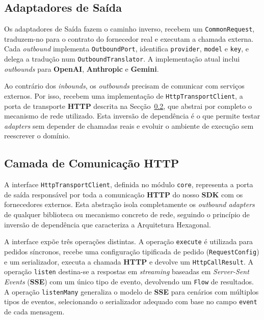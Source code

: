     \subsection{Adaptadores de Saída}
    Os adaptadores de Saída fazem o caminho inverso, recebem um \texttt{CommonRequest}, traduzem-no para o contrato do fornecedor real e executam a chamada externa. Cada \textit{outbound} implementa \texttt{OutboundPort}, identifica \texttt{provider}, \texttt{model} e \texttt{key}, e delega a tradução num \texttt{OutboundTranslator}. A implementação atual inclui \textit{outbounds} para \textbf{OpenAI}, \textbf{Anthropic} e \textbf{Gemini}.

    Ao contrário dos \textit{inbounds}, os \textit{outbounds} precisam de comunicar com serviços externos. Por isso, recebem uma implementação de \texttt{HttpTransportClient}, a porta de transporte \textbf{HTTP} descrita na Secção~\ref{subsec:http-transport-client}, que abstrai por completo o mecanismo de rede utilizado. Esta inversão de dependência é o que permite testar \textit{adapters} sem depender de chamadas reais e evoluir o ambiente de execução sem reescrever o domínio.

    \subsection{Camada de Comunicação HTTP}
    \label{subsec:http-transport-client}

    A interface \texttt{HttpTransportClient}, definida no módulo \texttt{core}, representa a porta de saída responsável por toda a comunicação \textbf{HTTP} do nosso \textbf{SDK} com os fornecedores externos. Esta abstração isola completamente os \textit{outbound adapters} de qualquer biblioteca ou mecanismo concreto de rede, seguindo o princípio de inversão de dependência que caracteriza a Arquitetura Hexagonal.

    A interface expõe três operações distintas. A operação \texttt{execute} é utilizada para pedidos síncronos, recebe uma configuração tipificada de pedido (\texttt{RequestConfig}) e um serializador, executa a chamada \textbf{HTTP} e devolve um \texttt{HttpCallResult}. A operação \texttt{listen} destina-se a respostas em \textit{streaming} baseadas em \textit{Server-Sent Events} (\textbf{SSE}) com um único tipo de evento, devolvendo um \texttt{Flow} de resultados. A operação \texttt{listenMany} generaliza o modelo de \textbf{SSE} para cenários com múltiplos tipos de eventos, selecionando o serializador adequado com base no campo \texttt{event} de cada mensagem.

